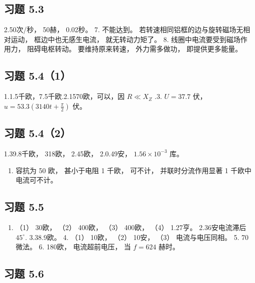 \subsection{习题 5.3}\label{ux4e60ux9898-5.3-1}

2.50次/秒， 50赫， 0.02秒。 7. 不能达到。
若转速相同铝框的边与旋转磁场无相对运动， 框边中也无感生电流，
就无转动力矩了。 8. 线圈中电流要受到磁场作用力， 阻碍电枢转动。
要维持原来转速， 外力需多做功， 即提供更多能量。

\subsection{习题 5.4（1）}\label{ux4e60ux9898-5.41-1}

1.1.5千欧，7.5千欧.2.1570欧，可以，因 \(R \ll X_{Z}\) .3. \(U = 37.7\)
伏， \(u = 53.3\left(3140t + \frac{\pi}{2}\right)\) 伏。

\subsection{习题 5.4（2）}\label{ux4e60ux9898-5.42-1}

1.39.8千欧， 318欧， 2.45欧， 2.0.49安， \(1.56 \times 10^{-3}\) 库。

\begin{enumerate}
\def\labelenumi{\arabic{enumi}.}
\setcounter{enumi}{2}
\tightlist
\item
  容抗为 50 欧， 甚小于电阻 1 千欧， 可不计， 并联时分流作用显著 1
  千欧中电流可不计。
\end{enumerate}

\subsection{习题 5.5}\label{ux4e60ux9898-5.5-1}

\begin{enumerate}
\def\labelenumi{\arabic{enumi}.}
\tightlist
\item
  （1） 30欧， （2） 400欧， （3） 400欧， （4） 1.27亨。 2.36安电流滞后
  \(45^{\circ}\). 3.38.9欧。 4. （1） 10欧， （2） 10安， （3）
  电流与电压同相。 5. 70微法。 6. 180欧， 电流超前电压， 当 \(f = 624\)
  赫时。
\end{enumerate}

\subsection{习题 5.6}\label{ux4e60ux9898-5.6-1}

